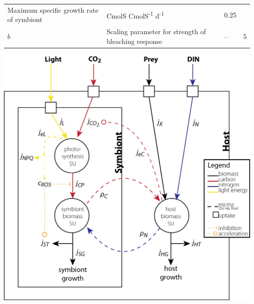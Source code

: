 \documentclass[]{elsarticle} %
\makeatletter
\def\maxwidth{\ifdim\Gin@nat@width>\linewidth\linewidth
\else\Gin@nat@width\fi}
\let\Oldincludegraphics\includegraphics
\renewcommand{\includegraphics}[1]{\Oldincludegraphics[width=\maxwidth]{#1}}
\makeatother
\begin{document}
\begin{longtable}[c]{@{}llll@{}}
\begin{minipage}[t]{0.48\columnwidth}
Maximum specific growth rate of symbiont
\strut\end{minipage} &
\begin{minipage}[t]{0.25\columnwidth}\raggedright\strut
CmolS CmolS\textsuperscript{-1} d\textsuperscript{-1}
\strut\end{minipage} &
\begin{minipage}[t]{0.10\columnwidth}\raggedright\strut
0.25
\strut\end{minipage}\tabularnewline
\begin{minipage}[t]{0.10\columnwidth}\raggedright\strut
\(b\)
\strut\end{minipage} &
\begin{minipage}[t]{0.48\columnwidth}\raggedright\strut
Scaling parameter for strength of bleaching response
\strut\end{minipage} &
\begin{minipage}[t]{0.25\columnwidth}\raggedright\strut
--
\strut\end{minipage} &
\begin{minipage}[t]{0.10\columnwidth}\raggedright\strut
5
\strut\end{minipage}\tabularnewline
\bottomrule
\end{longtable}

\includegraphics{../img/Fig1.png}
\end{document}
